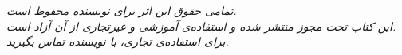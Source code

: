 \begin{center}
    \vfill

    {\small
         \\
         \\
    }

    \vspace{0.5cm}

    {\footnotesize\itshape
        تمامی حقوق این اثر برای نویسنده محفوظ است. \\
        این کتاب تحت مجوز  منتشر شده و استفاده‌ی
        آموزشی و غیرتجاری از آن آزاد است. \\
        برای استفاده‌ی تجاری، با نویسنده تماس بگیرید.
    }
\end{center}

\clearpage
